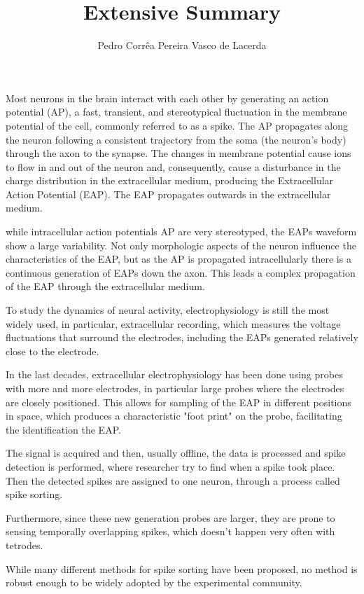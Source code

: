 \documentclass[10pt]{article}
\title{Extensive Summary}
\author{Pedro Corrêa Pereira Vasco de Lacerda}
\begin{document}
\maketitle
Most neurons in the brain interact with each other by generating an action potential (AP), a fast, transient, and stereotypical fluctuation in the membrane potential of the cell, commonly referred to as a spike. The AP propagates along the neuron following a consistent trajectory from the soma (the neuron's body) through the axon to the synapse. 
The changes in membrane potential cause ions to flow in and out of the neuron and, consequently, cause a disturbance in the charge distribution in the extracellular medium, producing the Extracellular Action Potential (EAP). The EAP propagates outwards in the extracellular medium. \cite{kandel}

while intracellular action potentials AP are very stereotyped, the EAPs waveform show a large variability. Not only morphologic aspects of the neuron influence the characteristics of the EAP, but as the AP is propagated intracellularly there is a continuous generation of EAPs  down the axon. This leads a complex propagation of the EAP through the extracellular medium. \cite{gold2006origin}

To study the dynamics of neural activity, electrophysiology is still the most widely used, in particular, extracellular recording, which measures the voltage fluctuations that surround the electrodes, including the EAPs generated relatively close to the electrode.

In the last decades, extracellular electrophysiology has been done using probes with more and more electrodes, in particular large probes where the electrodes are closely positioned. This allows for sampling of the EAP in different positions in space, which produces a characteristic "foot print" on the probe, facilitating the identification the EAP.
 
The signal is acquired and then, usually offline, the data is processed and spike detection is performed, where researcher try to find when a spike took place. Then the detected spikes are assigned to one neuron, through a process called spike sorting.

Furthermore, since these new generation probes are larger, they are prone to sensing temporally overlapping spikes, which doesn't happen very often with tetrodes.

While many different methods for spike sorting have been proposed, no method is robust enough to be widely adopted by the experimental community.
\end{document}
